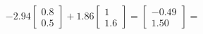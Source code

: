 \documentclass[preview]{standalone}
\begin{document}
\begin{align*}
-2.94 \begin{bmatrix} 0.8 \\ 0.5 \end{bmatrix} + 1.86 \begin{bmatrix} 1 \\ 1.6 \end{bmatrix} = \begin{bmatrix} -0.49 \\ 1.50 \end{bmatrix} =
\end{align*}
\end{document}
